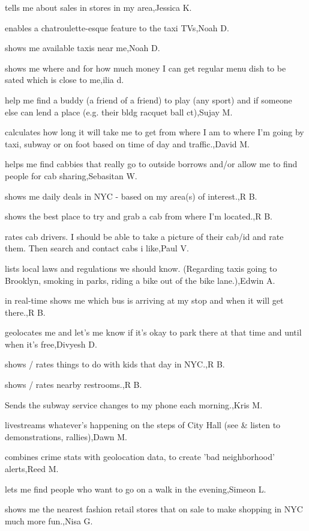 \documentclass{article}
\begin{document}
tells me about sales in stores in my area,Jessica K.

enables a chatroulette-esque feature to the taxi TVs,Noah D.

shows me available taxis near me,Noah D.

shows me where and for how much money I can get regular menu dish to be sated which is close to me,ilia d.

help me find a buddy (a friend of a friend) to play (any sport) and if someone else can lend a place (e.g. their bldg racquet ball ct),Sujay M.

calculates how long it will take me to get from where I am to where I'm going by taxi, subway or on foot based on time of day and traffic.,David M.

helps me find cabbies that really go to outside borrows and/or allow me to find people for cab sharing,Sebasitan W.

shows me daily deals in NYC - based on my area(s) of interest.,R B.

shows the best place to try and grab a cab from where I'm located.,R B.

rates cab drivers.  I should be able to take a picture of their cab/id and rate them. Then search and contact cabs i like,Paul V.

lists local laws and regulations we should know. (Regarding taxis going to Brooklyn, smoking in parks, riding a bike out of the bike lane.),Edwin A.

in real-time shows me which bus is arriving at my stop and when it will get there.,R B.

geolocates me and let's me know if it's okay to park there at that time and until when it's free,Divyesh D.

shows / rates things to do with kids that day in NYC.,R B.

shows / rates nearby restrooms.,R B.

Sends the subway service changes to my phone each morning.,Kris M.

livestreams whatever's happening on the steps of City Hall (see \& listen to demonstrations, rallies),Dawn M.

combines crime stats with geolocation data, to create 'bad neighborhood' alerts,Reed M.

lets me find people who want to go on a walk in the evening,Simeon L.

shows me the nearest fashion retail stores that on sale to make shopping in NYC much more fun.,Nisa G.
\end{document}

